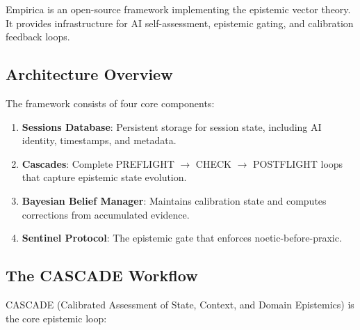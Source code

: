 
Empirica is an open-source framework implementing the epistemic vector theory. It provides infrastructure for AI self-assessment, epistemic gating, and calibration feedback loops.

\subsection{Architecture Overview}

The framework consists of four core components:

\begin{enumerate}
    \item \textbf{Sessions Database}: Persistent storage for session state, including AI identity, timestamps, and metadata.
    \item \textbf{Cascades}: Complete PREFLIGHT $\rightarrow$ CHECK $\rightarrow$ POSTFLIGHT loops that capture epistemic state evolution.
    \item \textbf{Bayesian Belief Manager}: Maintains calibration state and computes corrections from accumulated evidence.
    \item \textbf{Sentinel Protocol}: The epistemic gate that enforces noetic-before-praxic.
\end{enumerate}

\subsection{The CASCADE Workflow}

CASCADE (Calibrated Assessment of State, Context, and Domain Epistemics) is the core epistemic loop:

